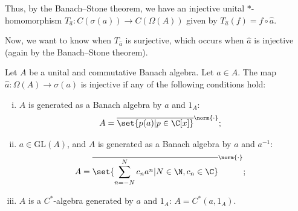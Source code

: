 Thus, by the Banach--Stone theorem, we have an injective unital $\ast$-homomorphism $T_{\hat{a}}\colon C\left(\sigma(a)\right) \rightarrow C\left( \Omega\left( A \right) \right)$ given by $T_{\hat{a}}(f) = f\circ \hat{a}$.\newline

Now, we want to know when $T_{\hat{a}}$ is surjective, which occurs when $\hat{a}$ is injective (again by the Banach--Stone theorem).
\begin{proposition}
  Let $A$ be a unital and commutative Banach algebra. Let $a\in A$. The map $\hat{a}\colon \Omega(A)\rightarrow \sigma(a)$ is injective if any of the following conditions hold:
  \begin{enumerate}[(i)]
    \item $A$ is generated as a Banach algebra by $a$ and $1_A$:
      \begin{align*}
        A &= \overline{\set{p(a) | p\in \C[x]}}^{\norm{\cdot}};
      \end{align*}
    \item $a\in \text{GL}(A)$, and $A$ is generated as a Banach algebra by $a$ and $a^{-1}$:
      \begin{align*}
        A &= \overline{\set{\sum_{n=-N}^{N}c_na^n | N\in\N,c_n\in\C}}^{\norm{\cdot}};
      \end{align*}
    \item $A$ is a $C^{\ast}$-algebra generated by $a$ and $1_A$: $A = C^{\ast}\left( a,1_A \right)$.
  \end{enumerate}
\end{proposition}

